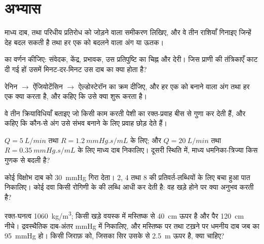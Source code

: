 \section{अभ्यास}

\begin{exercise}[$\star$]\label{exo:b2:blood-pressure:1}
माध्य दाब,  तथा परिधीय प्रतिरोध को जोड़ने वाला
समीकरण लिखिए, और वे तीन राशियाँ गिनाइए जिन्हें देह बदल सकती है तथा
हर एक को बदलने वाला अंग या ऊतक।
\end{exercise}

\begin{exercise}[$\star$]\label{exo:b2:blood-pressure:2}
 का वर्णन कीजिए: संवेदक, केंद्र, प्रभावक, उस
प्रतिपुष्टि का चिह्न और देरी। जिस प्राणी की  तंत्रिकाएँ काट दी गई
हों उसमें मिनट-दर-मिनट उस दाब का क्या होता है?
\end{exercise}

\begin{exercise}[$\star$]\label{exo:b2:blood-pressure:3}
रेनिन $\to$ ऐंजियोटेंसिन $\to$ ऐल्डोस्टेरॉन का क्रम दीजिए, और
हर एक को बनाने वाला अंग तथा हर एक क्या करता है, और कहिए कि उसे क्या
शुरू करता है।
\end{exercise}

\begin{exercise}[$\star$]\label{exo:b2:blood-pressure:4}
वे तीन क्रियाविधियाँ बताइए जो किसी काम करती पेशी का रक्त-प्रवाह
बीस से गुणा कर देती हैं, और कहिए कि कौन-से अंग उसे संभव बनाने के लिए प्रवाह
छोड़ देते हैं।
\end{exercise}

\begin{exercise}[$\star\star$]\label{exo:b2:blood-pressure:5}
$Q = \qty{5}{L/min}$ तथा $R =
\qty{1.2}{mmHg.s/mL}$ के लिए; और $Q = \qty{20}{L/min}$ तथा $R =
\qty{0.35}{mmHg.s/mL}$ के लिए माध्य दाब निकालिए। दूसरी स्थिति में,
माध्य धमनिका-त्रिज्या किस गुणक से बदली है?
\end{exercise}

\begin{exercise}[$\star\star$]\label{exo:b2:blood-pressure:6}
कोई विक्षोभ दाब को \qty{30}{mmHg} गिरा देता। 2, 4 तथा 8 की
प्रतिवर्त-लब्धियों के लिए बचा हुआ पात निकालिए। कोई दवा किसी रोगिणी के
 की लब्धि आधी कर देती है: वह खड़े होने पर क्या अनुभव करती है?
\end{exercise}

\begin{exercise}[$\star\star$]\label{exo:b2:blood-pressure:7}
रक्त-घनत्व \qty{1060}{kg/m^3}; किसी खड़े वयस्क में मस्तिष्क
 से \qty{40}{cm} ऊपर है और पैर \qty{120}{cm} नीचे।
द्रवस्थैतिक दाब-अंतर mmHg में निकालिए, और मस्तिष्क पर तथा टख़ने पर धमनीय
दाब जब  का \qty{95}{mmHg} हो। किसी जिराफ़ को, जिसका सिर उसके
 से \qty{2.5}{m} ऊपर है, क्या चाहिए?
\end{exercise}

